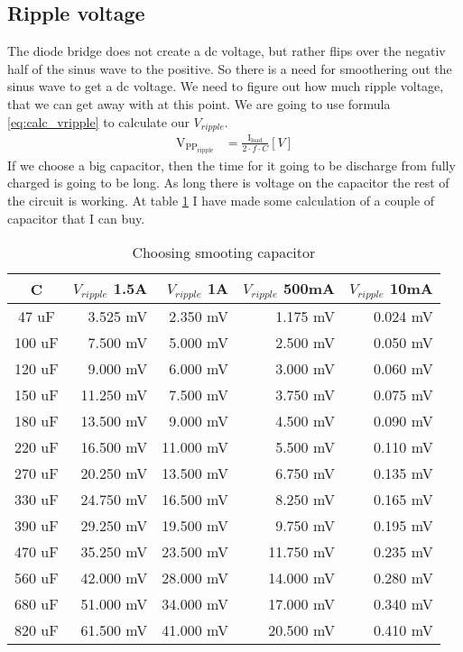 \subsection{Ripple voltage}
The diode bridge does not create a dc voltage, but rather flips over the negativ half of the sinus wave to the positive. So there is a need for smoothering out the sinus wave to get a dc voltage. 
We need to figure out how much ripple voltage, that we can get away with at this point. We are going to use formula \ref{eq:calc_vripple} to calculate our $V_{ripple}$.
\begin{align}\label{eq:calc_vripple}
\text{V}_{ \text{PP}_{\text{ripple} }} &= \frac{ \text{I}_{ \text{load} } }{ 2 \cdot f \cdot C } [V]
\end{align}
If we choose a big capacitor, then the time for it going to be discharge from fully charged is going to be long. As long there is voltage on the capacitor the rest of the circuit is working. At table \ref{tab:choose-c} I have made some calculation of a couple of capacitor that I can buy.
\begin{table}[ht]
\centering
\caption{Choosing smooting capacitor} \label{tab:choose-c}
\begin{tabular}{|c|r|r|r|r|} 
\hline
C & $V_{ripple}$ \@ 1.5A & $V_{ripple}$ \@ 1A & $V_{ripple}$ \@ 500mA & $V_{ripple}$ \@ 10mA \\ \hline \hline
 47 uF  &  3.525 mV &  2.350 mV &  1.175 mV & 0.024 mV \\ \hline
100 uF  &  7.500 mV &  5.000 mV &  2.500 mV & 0.050 mV \\ \hline
120 uF  &  9.000 mV &  6.000 mV &  3.000 mV & 0.060 mV \\ \hline
150 uF  & 11.250 mV	&  7.500 mV &  3.750 mV & 0.075 mV \\ \hline
180 uF  & 13.500 mV &  9.000 mV &  4.500 mV & 0.090 mV \\ \hline
220 uF  & 16.500 mV & 11.000 mV &  5.500 mV & 0.110 mV \\ \hline
270 uF  & 20.250 mV & 13.500 mV &  6.750 mV & 0.135 mV \\ \hline
330 uF  & 24.750 mV & 16.500 mV &  8.250 mV & 0.165 mV \\ \hline
390 uF  & 29.250 mV & 19.500 mV &  9.750 mV & 0.195 mV \\ \hline
470 uF  & 35.250 mV & 23.500 mV & 11.750 mV	& 0.235 mV \\ \hline
560 uF  & 42.000 mV & 28.000 mV	& 14.000 mV & 0.280 mV \\ \hline
680 uF  & 51.000 mV & 34.000 mV & 17.000 mV & 0.340 mV \\ \hline
820 uF  & 61.500 mV & 41.000 mV & 20.500 mV & 0.410 mV \\ \hline
\end{tabular}
\end{table}